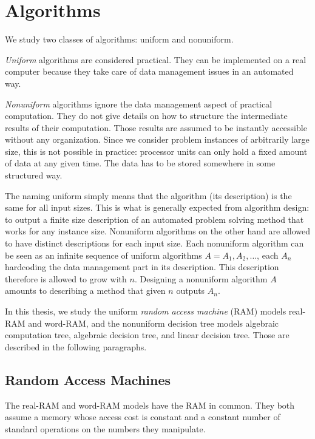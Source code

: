 \section{Algorithms}%
\label{sec:models-of-computation:algorithms}

We study two classes of algorithms: uniform and nonuniform.

\emph{Uniform} algorithms are considered practical. They can be implemented on
a real computer because they take care of data management issues in an
automated way.

\emph{Nonuniform} algorithms ignore the data management aspect of practical
computation. They do not give details on how to structure the intermediate
results of their computation. Those results are assumed to be instantly
accessible without any organization. Since we consider problem instances of
arbitrarily large size, this is not possible in practice:
processor units can only hold a fixed amount of data at any given time. The
data has to be stored somewhere in some structured way.

The naming uniform simply means that the algorithm (its description) is the
same for all input sizes. This is what is generally expected from algorithm
design: to output a finite size description of an automated problem solving
method that works for any instance size.
%
Nonuniform algorithms on the other hand are allowed to have distinct
descriptions for each input size. Each nonuniform algorithm can be seen as an
infinite sequence of uniform algorithms \(A = A_1, A_2, \ldots\), each \(A_n\)
hardcoding the data management part in its description. This description
therefore is allowed to grow with \(n\).
Designing a nonuniform algorithm \(A\) amounts to describing a method
that given \(n\) outputs \(A_n\).

In this thesis, we study the uniform \emph{random access machine} (RAM) models
real-RAM and word-RAM, and the nonuniform decision tree models algebraic
computation tree, algebraic decision tree, and linear decision tree. Those are
described in the following paragraphs.

\subsection{Random Access Machines}%
\label{sec:models-of-computation:algorithms:ram}

The real-RAM and word-RAM models have the RAM in common. They both assume
a memory whose access cost is constant and a constant number of standard
operations on the numbers they manipulate.

